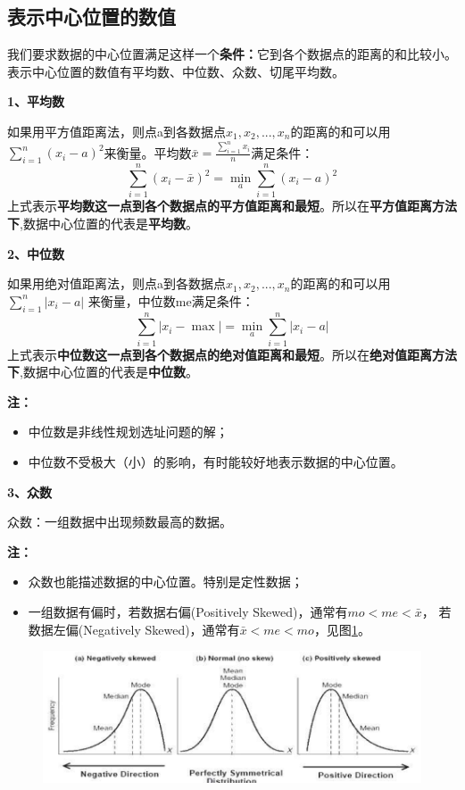 \documentclass[lang=cn,10pt]{elegantbook}
\begin{document}
\subsection{表示中心位置的数值}
我们要求数据的中心位置满足这样一个\textbf{条件：}它到各个数据点的距离的和比较小。
表示中心位置的数值有平均数、中位数、众数、切尾平均数。

\textbf{1、平均数}

如果用平方值距离法，则点a到各数据点$x_1,x_2,...,x_n$的距离的和可以用
$\sum_{i=1}^{n}(x_i-a)^2$来衡量。平均数$\bar{x} = \frac{\sum_{i=1}^{n}x_i}{n}$满足条件：
\begin{equation}
    \sum_{i=1}^n\left(x_i-\bar{x}\right)^2=\min_a\sum_{i=1}^n\left(x_i-a\right)^2
\end{equation}
上式表示\textbf{平均数这一点到各个数据点的平方值距离和最短}。所以在\textbf{平方值距离方法下},数据中心位置的代表是\textbf{平均数}。

\textbf{2、中位数}

如果用绝对值距离法，则点a到各数据点$x_1,x_2,...,x_n$的距离的和可以用$\sum_{i=1}^{n}|x_i-a|$
来衡量，中位数me满足条件：
\begin{equation}
    \sum_{i=1}^n|x_i-\max|=\min_a\sum_{i=1}^n|x_i-a|
\end{equation}
上式表示\textbf{中位数这一点到各个数据点的绝对值距离和最短}。所以在\textbf{绝对值距离方法下},数据中心位置的代表是\textbf{中位数}。

\textbf{注：}
\begin{itemize}
    \item 中位数是非线性规划选址问题的解；
    \item 中位数不受极大（小）的影响，有时能较好地表示数据的中心位置。
\end{itemize}

\textbf{3、众数}

众数：一组数据中出现频数最高的数据。

\textbf{注：}
\begin{itemize}
    \item 众数也能描述数据的中心位置。特别是定性数据；
    \item 一组数据有偏时，若数据右偏(Positively Skewed)，通常有$mo < me < \bar{x}$，
          若数据左偏(Negatively Skewed)，通常有$\bar{x} < me < mo$，见图\ref{im2_1}。
\end{itemize}

\begin{figure}
    \centering
    \includegraphics[scale = 0.6]{img/2_1.png}
    \caption{}
    \label{im2_1}
\end{figure}
\end{document}

